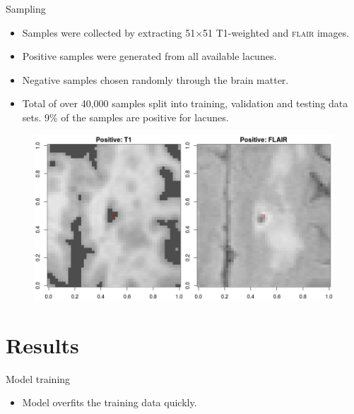 \documentclass{beamer}
\begin{document}
\begin{frame}{Sampling}
\begin{itemize}
\item Samples were collected by extracting 51$\times$51 T1-weighted and \textsc{flair} images.
\item Positive samples were generated from all available lacunes.
\item Negative samples chosen randomly through the brain matter.
\item Total of over 40,000 samples split into training, validation and testing data sets. 9\% of the samples are positive for lacunes.
\end{itemize}
\begin{figure}
\centering
\includegraphics[scale=0.37]{../Thesis_Docs/Images/6_positive.png}
\end{figure}
\end{frame}


\section{Results}


\begin{frame}{Model training}
\begin{itemize}
\item Model overfits the training data quickly.
\end{itemize}
\begin{figure}
\centering
\end{figure}
\end{frame}
\end{document}
